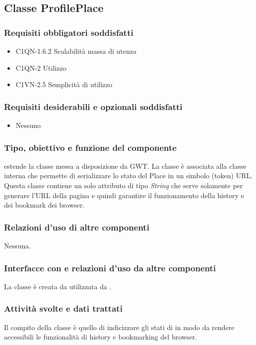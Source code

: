 \subsection{Classe ProfilePlace}
\subsubsection*{Requisiti obbligatori soddisfatti}
\begin{itemize}
    \item C1QN-1.6.2 Scalabilit\`a massa di utenza
    \item C1QN-2 Utilizzo
    \item C1VN-2.5 Semplicit\`a di utilizzo
\end{itemize}
\subsubsection*{Requisiti desiderabili e opzionali soddisfatti}
\begin{itemize}
    \item Nessuno
\end{itemize}
\subsubsection*{Tipo, obiettivo e funzione del componente}
 estende la classe  messa a disposizione da GWT. La
classe \`e associata alla classe interna  che permette di
serializzare lo stato del Place in un simbolo (token) URL.
Questa classe contiene un solo attributo di tipo \emph{String} che serve
solamente per generare l'URL della pagina e quindi garantire il funzionamento
della history e dei bookmark dei browser. 
\subsubsection*{Relazioni d'uso di altre componenti} Nessuna.
\subsubsection*{Interfacce con e relazioni d'uso da altre componenti} La classe
\`e creata da  utilizzata da . 
\subsubsection*{Attivit\`a svolte e dati trattati}
Il compito della classe \`e quello di indicizzare gli stati di
 in modo da rendere accessibili le funzionalit\`a di history
e bookmarking del browser.


